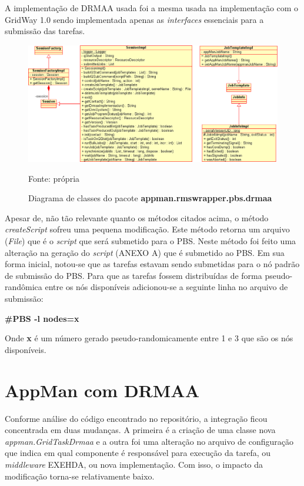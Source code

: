 A implementação de DRMAA usada foi a mesma usada na implementação com o GridWay 1.0 \cite{Herrera2007} sendo implementada apenas as \emph{interfaces} essenciais para a submissão das tarefas. 

\begin{figure}[htb]
\begin{center}
\includegraphics[scale=0.5]{./img/drmaaUML2.eps}
\caption{Diagrama de classes do pacote \textbf{appman.rmswrapper.pbs.drmaa}}
\label{fig:UML_DRMAA}
Fonte: própria
\end{center}
\end{figure}

Apesar de, não tão relevante quanto os métodos citados acima, o método \emph{createScript} sofreu uma pequena modificação. Este método retorna um arquivo (\emph{File}) que é o \emph{script} que será submetido para o PBS. Neste método foi feito uma alteração na geração do \emph{script} (ANEXO A) que é submetido ao PBS. Em sua forma inicial, notou-se que as tarefas estavam sendo submetidas para o nó padrão de submissão do PBS. Para que as tarefas fossem distribuídas de forma pseudo-randômica entre os nós disponíveis adicionou-se a seguinte linha no arquivo de submissão:

\textbf{\#PBS -l nodes=x}

Onde \textbf{x} é um número gerado pseudo-randomicamente entre 1 e 3 que são os nós disponíveis.

\section{AppMan com DRMAA}

Conforme análise do código encontrado no repositório, a integração ficou concentrada em duas mudanças. A primeira é a criação de uma classe nova \emph{appman.GridTaskDrmaa} e a outra foi uma alteração no arquivo de configuração que indica em qual componente é responsável para execução da tarefa, ou \emph{middleware} EXEHDA, ou nova implementação. Com isso, o impacto da modificação torna-se relativamente baixo. 

